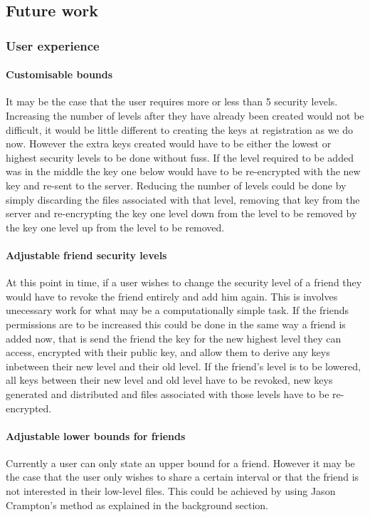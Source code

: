 \documentclass[12pt, titlepage]{article}
\begin{document}
\subsection{Future work}
\subsubsection*{User experience}
\paragraph*{Customisable bounds} It may be the case that the user requires more or less than 5 security levels. Increasing the number of levels after they have already been created would not be difficult, it would be little different to creating the keys at registration as we do now. However the extra keys created would have to be either the lowest or highest security levels to be done without fuss. If the level required to be added was in the middle the key one below would have to be re-encrypted with the new key and re-sent to the server. Reducing the number of levels could be done by simply discarding the files associated with that level, removing that key from the server and re-encrypting the key one level down from the level to be removed by the key one level up from the level to be removed.
\paragraph*{Adjustable friend security levels} At this point in time, if a user wishes to change the security level of a friend they would have to revoke the friend entirely and add him again. This is involves unecessary work for what may be a computationally simple task. If the friends permissions are to be increased this could be done in the same way a friend is added now, that is send the friend the key for the new highest level they can access, encrypted with their public key, and allow them to derive any keys inbetween their new level and their old level. If the friend's level is to be lowered, all keys between their new level and old level have to be revoked, new keys generated and distributed and files associated with those levels have to be re-encrypted.
\paragraph*{Adjustable lower bounds for friends} Currently a user can only state an upper bound for a friend. However it may be the case that the user only wishes to share a certain interval or that the friend is not interested in their low-level files. This could be achieved by using Jason Crampton's method as explained in the background section.
\end{document}
